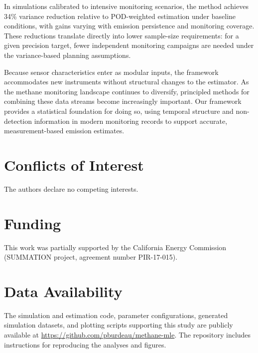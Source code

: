 \documentclass[numsec,webpdf,modern,mediumone]{oup-authoring-template}
\begin{document}
In simulations calibrated to intensive monitoring scenarios, the method achieves 34\% variance reduction relative to POD-weighted estimation under baseline conditions, with gains varying with emission persistence and monitoring coverage. These reductions translate directly into lower sample-size requirements: for a given precision target, fewer independent monitoring campaigns are needed under the variance-based planning assumptions.

Because sensor characteristics enter as modular inputs, the framework accommodates new instruments without structural changes to the estimator. As the methane monitoring landscape continues to diversify, principled methods for combining these data streams become increasingly important. Our framework provides a statistical foundation for doing so, using temporal structure and non-detection information in modern monitoring records to support accurate, measurement-based emission estimates.

\section*{Conflicts of Interest}

The authors declare no competing interests.

\section*{Funding}

This work was partially supported by the California Energy Commission (SUMMATION project, agreement number PIR-17-015).

\section*{Data Availability}

The simulation and estimation code, parameter configurations, generated simulation datasets, and plotting scripts supporting this study are publicly available at \url{https://github.com/pburdeau/methane-mle}. The repository includes instructions for reproducing the analyses and figures.
\end{document}
